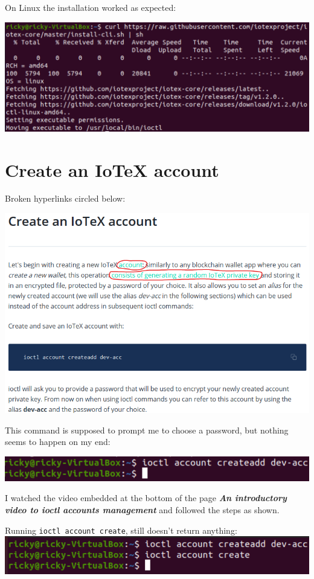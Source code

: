 \documentclass[
]{book}
\begin{document}
On Linux the installation worked as expected:

\includegraphics{images/linux_cli_install.PNG}

\hypertarget{create-an-iotex-account}{%
\section{Create an IoTeX account}\label{create-an-iotex-account}}

Broken hyperlinks circled below:

\includegraphics{images/create_iotex_account.png}

This command is supposed to prompt me to choose a password, but nothing
seems to happen on my end:

\includegraphics{images/create_account.png}

I watched the video embedded at the bottom of the page \textbf{\emph{An
introductory video to ioctl accounts management}} and followed the steps
as shown.

Running \texttt{ioctl\ account\ create}, still doesn't return anything:
\includegraphics{images/create_account_video.png}
\end{document}
